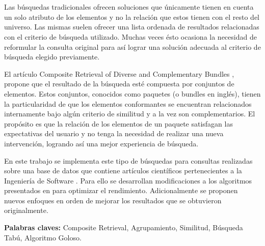 \chapter*{\runtitulo}

\noindent Las búsquedas tradicionales ofrecen soluciones que únicamente tienen en cuenta un solo atributo de los elementos y no la relación que estos tienen con el resto del universo. Las mismas suelen ofrecer una lista ordenada de resultados relacionadas con el criterio de búsqueda utilizado. Muchas veces ésto ocasiona la necesidad de reformular la consulta original para así lograr una solución adecuada al criterio de búsqueda elegido previamente.

El artículo Composite Retrieval of Diverse and Complementary Bundles \cite{compositeRetrival}, propone que el resultado de la búsqueda esté compuesta por conjuntos de elementos. Estos conjuntos, conocidos como paquetes (o bundles en inglés), tienen la particularidad de que los elementos conformantes se encuentran relacionados internamente bajo algún criterio de similitud y a la vez son complementarios. El propósito es que la relación de los elementos de un paquete satisfagan las expectativas del usuario y no tenga la necesidad de realizar una nueva intervención, logrando así una mejor experiencia de búsqueda.

En este trabajo se implementa este tipo de búsquedas para consultas realizadas sobre una base de datos que contiene artículos científicos pertenecientes a la Ingeniería de Software \cite{dataDrive}. Para ello se desarrollan modificaciones a los algoritmos presentados en \cite{compositeRetrival} para optimizar el rendimiento. Adicionalmente se proponen nuevos enfoques en orden de mejorar los resultados que se obtuvieron originalmente.

\bigskip

\noindent\textbf{Palabras claves:} Composite Retrieval, Agrupamiento, Similitud, Búsqueda Tabú, Algoritmo Goloso.